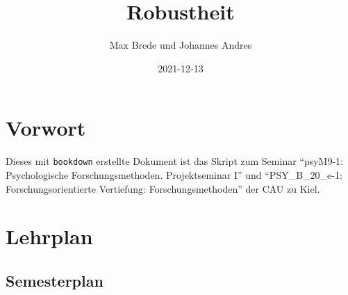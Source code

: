 \documentclass[
]{book}
\title{Robustheit}
\author{Max Brede und Johannes Andres}
\date{2021-12-13}
\begin{document}
\maketitle

{
\setcounter{tocdepth}{1}
\tableofcontents
}
\hypertarget{vorwort}{%
\chapter{Vorwort}\label{vorwort}}

Dieses mit \texttt{bookdown} erstellte Dokument ist das Skript zum Seminar ``psyM9-1: Psychologische Forschungsmethoden. Projektseminar I'' und ``PSY\_B\_20\_e-1: Forschungsorientierte Vertiefung: Forschungsmethoden'' der CAU zu Kiel.

\hypertarget{lehrplan}{%
\chapter{Lehrplan}\label{lehrplan}}

\hypertarget{semesterplan}{%
\section{Semesterplan}\label{semesterplan}}

\scriptsize
\end{document}
